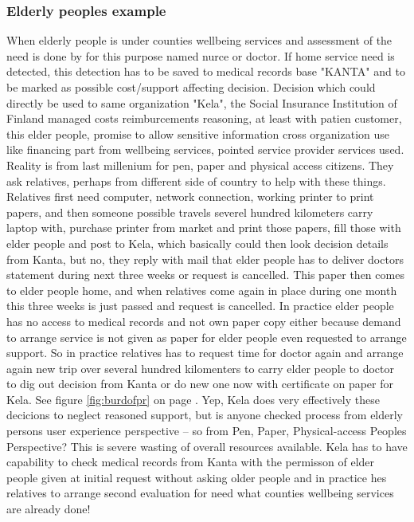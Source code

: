 \subsubsection{Elderly peoples example}
When elderly people is under counties wellbeing services
and assessment of the need is done by for this purpose named nurce or doctor.
If home service need is detected,
this detection has to be saved to medical records base "KANTA"
and to be marked as possible cost/support affecting decision.
Decision which could directly be used to same organization "Kela",
the Social Insurance Institution of Finland managed costs reimburcements reasoning,
at least with patien customer, this elder people,
promise to allow sensitive information cross organization use
like financing part from wellbeing services,
pointed service provider services used.
Reality is from last millenium for pen, paper and physical access citizens.
They ask relatives, perhaps from different side of country to help with these things.
Relatives first need computer, network connection, working printer to print papers,
and then someone possible travels severel hundred kilometers carry laptop with,
purchase printer from market and print those papers, fill those with elder people and post to Kela,
which basically could then look decision details from Kanta, but no,
they reply with mail that elder people has to deliver doctors statement during next three weeks or request is cancelled.
This paper then comes to elder people home,
and when relatives come again in place during one month this three weeks is just passed and request is cancelled.
In practice elder people has no access to medical records
and not own paper copy either because demand to arrange service is not given as paper for elder people even requested to arrange support.
So in practice relatives has to request time for doctor again and arrange again new trip over several hundred kilomenters to carry elder people to doctor to dig out decision from Kanta or do new one now with certificate on paper for Kela.
See figure \ref{fig:burdofpr} on page \pageref{fig:burdofpr}.
Yep, Kela does very effectively these decicions to neglect reasoned support,
but is anyone checked process from elderly persons user experience perspective --
so from Pen, Paper, Physical-access Peoples Perspective?
This is severe wasting of overall resources available\cite{ElakelaisetRynJanKoskimiesJaElakeliitonIreneVuorisalo}\-\cite{ElakelaisetEivatTieda}.
Kela has to have capability to check medical records from Kanta with the permisson of elder people given at initial request without asking older people and in practice hes relatives to arrange second evaluation for need what counties wellbeing services are already done!
